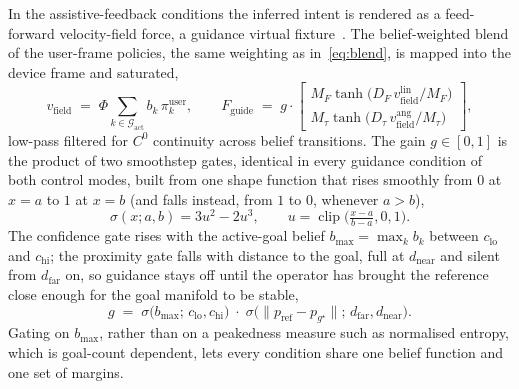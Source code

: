 \documentclass[12pt,a4paper,twoside,openright]{report}
\begin{document}
In the assistive-feedback conditions the inferred intent is rendered as a feed-forward velocity-field force, a guidance virtual fixture~\cite{rosenberg1993virtual,abbott2007haptic}. The belief-weighted blend of the user-frame policies, the same weighting as in~\eqref{eq:blend}, is mapped into the device frame and saturated,
\begin{equation}
v_{\text{field}} \;=\; \Phi\!\sum_{k \in \mathcal{G}_{\text{act}}} b_k\, \pi_k^{\text{user}},
\qquad
F_{\text{guide}} \;=\; g \cdot
\begin{bmatrix}
M_F \tanh\!\bigl(D_F\, v_{\text{field}}^{\text{lin}} / M_F\bigr)\\[2pt]
M_\tau \tanh\!\bigl(D_\tau\, v_{\text{field}}^{\text{ang}} / M_\tau\bigr)
\end{bmatrix},
\label{eq:fguide}
\end{equation}
low-pass filtered for $C^0$ continuity across belief transitions. The gain $g \in [0,1]$ is the product of two smoothstep gates, identical in every guidance condition of both control modes, built from one shape function that rises smoothly from $0$ at $x=a$ to $1$ at $x=b$ (and falls instead, from $1$ to $0$, whenever $a > b$),
\begin{equation}
\sigma(x; a, b) = 3u^2 - 2u^3,\qquad u = \operatorname{clip}\!\bigl(\tfrac{x-a}{b-a}, 0, 1\bigr).
\label{eq:smoothstep}
\end{equation}
The confidence gate rises with the active-goal belief $b_{\max} = \max_k b_k$ between $c_{\text{lo}}$ and $c_{\text{hi}}$; the proximity gate falls with distance to the goal, full at $d_{\text{near}}$ and silent from $d_{\text{far}}$ on, so guidance stays off until the operator has brought the reference close enough for the goal manifold to be stable,
\begin{equation}
g \;=\; \sigma\!\bigl(b_{\max};\, c_{\text{lo}}, c_{\text{hi}}\bigr)\;\cdot\;\sigma\!\bigl(\|p_{\text{ref}} - p_{g^{\star}}\|;\, d_{\text{far}}, d_{\text{near}}\bigr).
\label{eq:guidegate}
\end{equation}
Gating on $b_{\max}$, rather than on a peakedness measure such as normalised entropy, which is goal-count dependent, lets every condition share one belief function and one set of margins.
\end{document}
